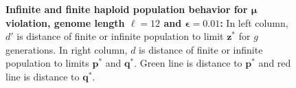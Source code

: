 \begin{figure}[h]
\begin{center}
\hspace{-3em}%
\vspace{-0.5em} \hspace{-3em}%
\caption[\textbf{Infinite and finite haploid population behavior for $\bm{\mu}$ violation, genome length $\ell = 12$ and $\bm{\epsilon} = 0.01$}]{\textbf{Infinite and finite haploid population behavior for $\bm{\mu}$ violation, genome length $\ell = 12$ and $\bm{\epsilon} = 0.01$:} 
  In left column, $d'$ is distance of finite or infinite population to limit $\bm{z}^\ast$ for $g$ generations. In right column, $d$ is distance of finite or infinite population to limits $\bm{p}^\ast$ and $\bm{q}^\ast$. Green line is distance to $\bm{p}^\ast$ and red line is distance to $\bm{q}^\ast$.}
\label{oscillation_12h_vio_mu_0.01}
\end{center}
\end{figure}


